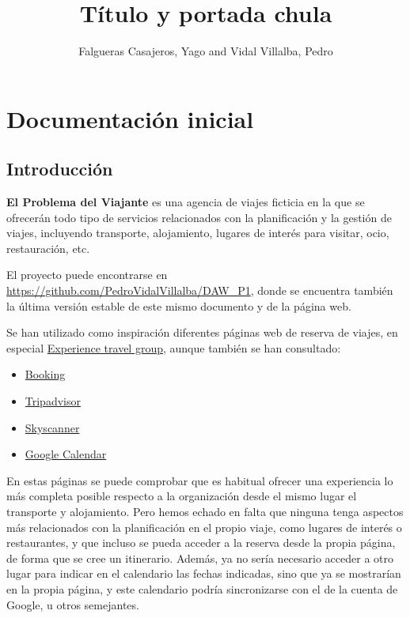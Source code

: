 \documentclass[11pt, a4paper]{book}
\title{Título y portada chula}
\author{Falgueras Casajeros, Yago and Vidal Villalba, Pedro}
\begin{document}
	\maketitle
	
	\tableofcontents
	\newpage
	\thispagestyle{empty}
	
	\chapter{Documentación inicial}
	
	\section{Introducción}
	\textbf{El Problema del Viajante} es una agencia de viajes ficticia en la que se ofrecerán todo tipo de servicios relacionados con la planificación y la gestión de viajes, incluyendo transporte, alojamiento, lugares de interés para visitar, ocio, restauración, etc.
	
	El proyecto puede encontrarse en \href{https://github.com/PedroVidalVillalba/DAW_P1}{https://github.com/PedroVidalVillalba/DAW\_P1}, donde se encuentra también la última versión estable de este mismo documento y de la página web.
	
	
	Se han utilizado como inspiración diferentes páginas web de reserva de viajes, en especial \href{https://experiencetravelgroup.com}{Experience travel group}, aunque también se han consultado:
	\begin{itemize}
		\item \href{https://booking.com}{Booking}
		\item \href{https://tripadvisor.es}{Tripadvisor}
		\item \href{https://skyscanner.es}{Skyscanner}
		\item \href{https://calendar.google.com/calendar/u/0/r}{Google Calendar}
	\end{itemize}
	
	 En estas páginas se puede comprobar que es habitual ofrecer una experiencia lo más completa posible respecto a la organización desde el mismo lugar el transporte y alojamiento. Pero hemos echado en falta que ninguna tenga aspectos más relacionados con la planificación en el propio viaje, como lugares de interés o restaurantes, y que incluso se pueda acceder a la reserva desde la propia página, de forma que se cree un itinerario. Además, ya no sería necesario acceder a otro lugar para indicar en el calendario las fechas indicadas, sino que ya se mostrarían en la propia página, y este calendario podría sincronizarse con el de la cuenta de Google, u otros semejantes.
	 
\end{document}
